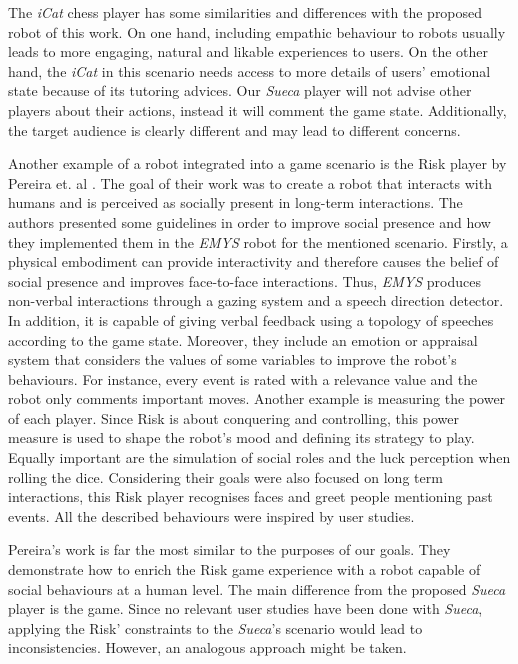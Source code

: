 The \emph{iCat} chess player has some similarities and differences with the proposed robot of this work.
On one hand, including empathic behaviour to robots usually leads to more engaging, natural and likable experiences to users.
On the other hand, the \emph{iCat} in this scenario needs access to more details of users' emotional state because of its tutoring advices. Our \emph{Sueca} player will not advise other players about their actions, instead it will comment the game state.
Additionally, the target audience is clearly different and may lead to different concerns.


Another example of a robot integrated into a game scenario is the Risk player by Pereira et. al \cite{Pereira}.
The goal of their work was to create a robot that interacts with humans and is perceived as socially present in long-term interactions.
The authors presented some guidelines in order to improve social presence and how they implemented them in the \emph{EMYS} robot for the mentioned scenario.
Firstly, a physical embodiment can provide interactivity and therefore causes the belief of social presence and improves face-to-face interactions.
Thus, \emph{EMYS} produces non-verbal interactions through a gazing system and a speech direction detector.
In addition, it is capable of giving verbal feedback using a topology of speeches according to the game state.
Moreover, they include an emotion or appraisal system that considers the values of some variables to improve the robot's behaviours.
For instance, every event is rated with a relevance value and the robot only comments important moves.
Another example is measuring the power of each player.
Since Risk is about conquering and controlling, this power measure is used to shape the robot's mood and defining its strategy to play.
Equally important are the simulation of social roles and the luck perception when rolling the dice.
Considering their goals were also focused on long term interactions, this Risk player recognises faces and greet people mentioning past events.
All the described behaviours were inspired by user studies.

Pereira's work is far the most similar to the purposes of our goals.
They demonstrate how to enrich the Risk game experience with a robot capable of social behaviours at a human level.
The main difference from the proposed \emph{Sueca} player is the game.
Since no relevant user studies have been done with \emph{Sueca}, applying the Risk' constraints to the \emph{Sueca}'s scenario would lead to inconsistencies.
However, an analogous approach might be taken.

